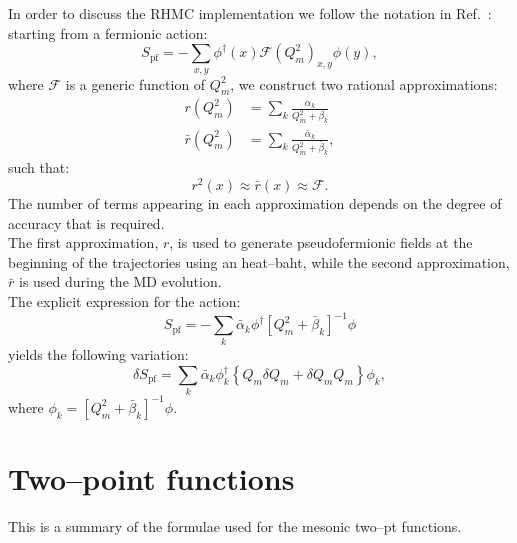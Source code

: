 \documentclass{article}[12pt]
\begin{document}
In order to discuss the RHMC implementation we follow the notation in
Ref.~\cite{Clark:2005sq}: starting from a fermionic action:
%
\begin{equation}
S_\mathrm{pf}=-\sum_{x,y} \phi^\dagger(x) \mathcal F(Q^2_m)_{x,y} \phi(y),
\end{equation}
%
where $\mathcal F$ is a generic function of $Q^2_m$, we construct two
rational approximations:
%
\begin{align}
r(Q^2_m) &= \sum_k \frac{\alpha_k}{Q^2_m + \beta_k} 
\nonumber \\
\bar r(Q^2_m) &= \sum_k \frac{\bar \alpha_k}{Q^2_m + \bar \beta_k}, \nonumber
\end{align}
%
such that:
%
\begin{equation}
r^2(x) \approx \bar r(x) \approx \mathcal F.
\end{equation}
%
The number of terms appearing in each approximation depends on the
degree of accuracy that is required. \\
The first approximation, $r$, is used to generate pseudofermionic fields at
the beginning of the trajectories using an heat--baht, while the
second approximation, $\bar r$ is used during the MD evolution. \\
The explicit expression for the action:
%
\begin{equation}
S_\mathrm{pf}= - \sum_k \bar \alpha_k \phi^\dagger \left[Q^2_m + \bar
  \beta_k \right]^{-1} \phi
\end{equation} 
%
yields the following variation:
%
\begin{equation}
\delta S_\mathrm{pf} = \sum_k \bar\alpha_k \phi_k^\dagger
\left\{Q_m \delta Q_m + \delta Q_m Q_m \right\} \phi_k,
\end{equation}
%
where $\phi_k=\left[Q^2_m + \bar
  \beta_k \right]^{-1} \phi$.

\section{Two--point functions}
This is a summary of the formulae used for the mesonic two--pt
functions. 

\bigskip
\end{document}
